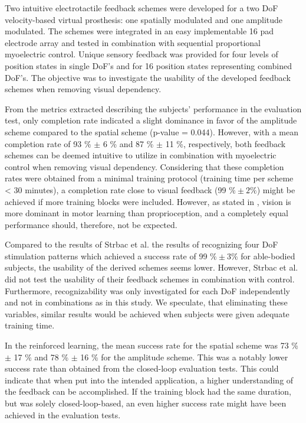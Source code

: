 Two intuitive electrotactile feedback schemes were developed for a two DoF velocity-based virtual prosthesis: one spatially modulated and one amplitude modulated. The schemes were integrated in an easy implementable 16 pad electrode array and tested in combination with sequential proportional myoelectric control. Unique sensory feedback was provided for four levels of position states in single DoF's and for 16 position states representing combined DoF's. The objective was to investigate the usability of the developed feedback schemes when removing visual dependency.

From the metrics extracted describing the subjects' performance in the evaluation test, only completion rate indicated a slight  dominance in favor of the amplitude scheme compared to the spatial scheme (p-value = 0.044). However, with a mean completion rate of 93 \% $\pm$ 6 \% and 87 \% $\pm$ 11 \%, respectively, both feedback schemes can be deemed intuitive to utilize in combination with myoelectric control when removing visual dependency. Considering that these completion rates were obtained from a minimal training protocol (training time per scheme < 30 minutes), a completion rate close to visual feedback (99 $\% \pm 2\%$) might be achieved if more training blocks were included. However, as stated in \cite{Adams1977}, vision is more dominant in motor learning than proprioception, and a completely equal performance should, therefore, not be expected.

Compared to the results of Strbac et al. \cite{Strbac2016} the results of recognizing four DoF stimulation patterns which achieved a success rate of 99 $\% \pm 3\%$ for able-bodied subjects, the usability of the derived schemes seems lower. However, Strbac et al. did not test the usability of their feedback schemes in combination with control. Furthermore, recognizability was only investigated for each DoF independently and not in combinations as in this study. We speculate, that eliminating these variables, similar results would be achieved when subjects were given adequate training time.       

In the reinforced learning, the mean success rate for the spatial scheme was 73 \%  $\pm$ 17 \% and 78 \%  $\pm$ 16 \% for the amplitude scheme. This was a notably lower success rate than obtained from the closed-loop evaluation tests. This could indicate that when put into the intended application, a higher understanding of the feedback can be accomplished. If the training block had the same duration, but was solely closed-loop-based, an even higher success rate might have been achieved in the evaluation tests. 

